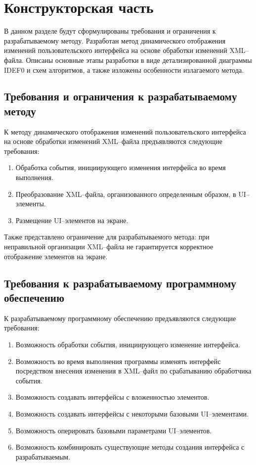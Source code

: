 \section{Конструкторская часть}

В данном разделе будут сформулированы требования и ограничения к разрабатываемому методу. 
Разработан метод динамического отображения изменений пользовательского интерфейса на основе обработки изменений XML--файла.
Описаны основные этапы разработки в виде детализированной диаграммы IDEF0 и схем алгоритмов, а также изложены особенности излагаемого метода. 

\subsection{Требования и ограничения к разрабатываемому методу}

К методу динамического отображения изменений пользовательского интерфейса на основе обработки изменений XML--файла предъявляются следующие требования:
\begin{enumerate}
	\item Обработка события, инициирующего изменения интерфейса во время выполнения.
	\item Преобразование XML--файла, организованного определенным образом, в UI--элементы.
	\item Размещение UI--элементов на экране.
\end{enumerate}
	
Также представлено ограничение для разрабатываемого метода: при неправильной организации XML--файла не гарантируется корректное отображение элементов на экране.




\subsection{Требования к разрабатываемому программному обеспечению}

К разрабатываемому программному обеспечению предъявляются следующие требования:
\begin{enumerate}
	\item Возможность обработки события, инициирующего изменение интерфейса.
	\item Возможность во время выполнения программы изменять интерфейс посредством внесения изменения в XML--файл по срабатыванию обработчика события.
	\item Возможность создавать интерфейсы с вложенностью элементов.
	\item Возможность создавать интерфейсы с некоторыми базовыми UI--элементами.
	\item Возможность оперировать базовыми параметрами UI--элементов.
	\item Возможность комбинировать существующие методы создания интерфейса с разрабатываемым.
\end{enumerate}

